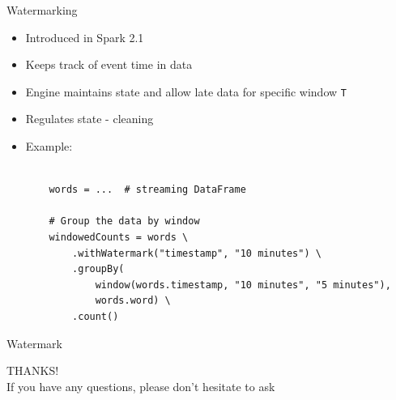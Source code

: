 \documentclass{beamer}
\begin{document}
\begin{frame}[fragile]{Watermarking}
\begin{itemize}
	\item<1-> Introduced in Spark 2.1
	\item<2-> Keeps track of event time in data
	\item<3-> Engine maintains state and allow late data for specific window \texttt{T}
	\item<4-> Regulates state - cleaning\\
	\item<5-> {Example:
	\scriptsize
\begin{verbatim}

	words = ...  # streaming DataFrame

	# Group the data by window
	windowedCounts = words \
    	.withWatermark("timestamp", "10 minutes") \
    	.groupBy(
        	window(words.timestamp, "10 minutes", "5 minutes"),
        	words.word) \
    	.count()
\end{verbatim}
}
\end{itemize}

\end{frame}

\begin{frame}{Watermark}
\end{frame}

\begin{frame}
\begin{center}
\huge{THANKS!}\\[2ex]
\normalsize{If you have any questions, please don't hesitate to ask}
\end{center}
\end{frame}
\end{document}
